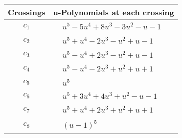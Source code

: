 \documentclass[1p]{elsarticle_modified}
\theoremstyle{definition}
\begin{document}
\begin{tabular}{m{50pt}|m{274pt}}
Crossings & \hspace{64pt}u-Polynomials at each crossing \\
\hline $$\begin{aligned}c_{1}\end{aligned}$$&$\begin{aligned}
&u^5-5 u^4+8 u^3-3 u^2- u-1
\end{aligned}$\\
\hline $$\begin{aligned}c_{2}\end{aligned}$$&$\begin{aligned}
&u^5+u^4-2 u^3- u^2+u-1
\end{aligned}$\\
\hline $$\begin{aligned}c_{3}\end{aligned}$$&$\begin{aligned}
&u^5- u^4+2 u^3- u^2+u-1
\end{aligned}$\\
\hline $$\begin{aligned}c_{4}\end{aligned}$$&$\begin{aligned}
&u^5- u^4-2 u^3+u^2+u+1
\end{aligned}$\\
\hline $$\begin{aligned}c_{5}\end{aligned}$$&$\begin{aligned}
&u^5
\end{aligned}$\\
\hline $$\begin{aligned}c_{6}\end{aligned}$$&$\begin{aligned}
&u^5+3 u^4+4 u^3+u^2- u-1
\end{aligned}$\\
\hline $$\begin{aligned}c_{7}\end{aligned}$$&$\begin{aligned}
&u^5+u^4+2 u^3+u^2+u+1
\end{aligned}$\\
\hline $$\begin{aligned}c_{8}\end{aligned}$$&$\begin{aligned}
&(u-1)^5
\end{aligned}$\\

\end{tabular}
\end{document}
